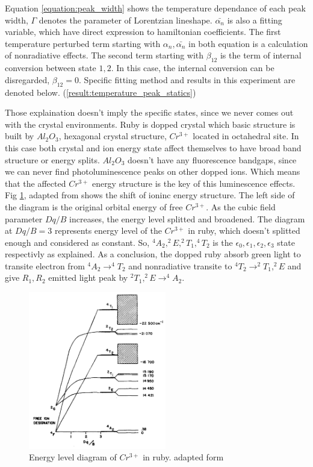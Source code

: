 \documentclass{article}
\begin{document}
 Equation \ref{equation:peak_width} shows the temperature dependance of each peak width, $\Gamma$ denotes the parameter of Lorentzian lineshape.
 $\bar{\alpha_n}$ is also a fitting variable, which have direct expression to hamiltonian coefficients.
 The first temperature perturbed term starting with $\alpha_n, \bar{\alpha_n}$ in both equation is a calculation of nonradiative effects.
 The second term starting with $\beta_{12}$ is the term of internal conversion between state $1,2$.
 In this case, the internal conversion can be disregarded, $\beta_{12}=0$.
 Specific fitting method and results in this experiment are denoted below. (\ref{result:temperature_peak_statics})

 Those explaination doesn't imply the specific states, since we never comes out with the crystal environments.
 Ruby is dopped crystal which basic structure is built by $Al_2O_3$, hexagonal crystal structure, $Cr^{3+}$ located in octahedral site.
 In this case both crystal and ion energy state affect themselves to have broad band structure or energy splits.
 $Al_2 O_3$ doesn't have any fluorescence bandgaps, since we can never find photoluminescence peaks on other dopped ions.
 Which means that the affected $Cr^{3+}$ energy structure is the key of this luminescence effects.
 Fig \ref{fig:ruby_band_structure}, adapted from \cite{Ruby_band_structure} shows the shift of ioninc energy structure.
 The left side of the diagram is the original orbital energy of free $Cr^{3+}$.
 As the cubic field parameter $Dq/B$ increases, the energy level splitted and broadened.
 The diagram at $Dq/B=3$ represents energy level of the $Cr^{3+}$ in ruby, which doesn't splitted enough and considered as constant.
 So, $^4A_2 , ^2E, ^2T_1 , ^4T_2$ is the $\epsilon_0, \epsilon_1, \epsilon_2, \epsilon_3$ state respectivly as explained.
 As a conclusion, the dopped ruby absorb green light to transite electron from $^4A_2 \rightarrow ^4T_2$ and nonradiative transite to $^4T_2 \rightarrow ^2T_1 , ^2E$ and give $R_1 , R_2$ emitted light peak by $^2T_1 , ^2E \rightarrow ^4A_2$. 

 \begin{figure}[ht]
  \centering
  \includegraphics[width=6cm]{../results/ruby_band_diagram.png}
  \caption{Energy level diagram of $Cr^{3+}$ in ruby. adapted form \cite{Ruby_band_structure}}
  \label{fig:ruby_band_structure}
\end{figure}
\end{document}
